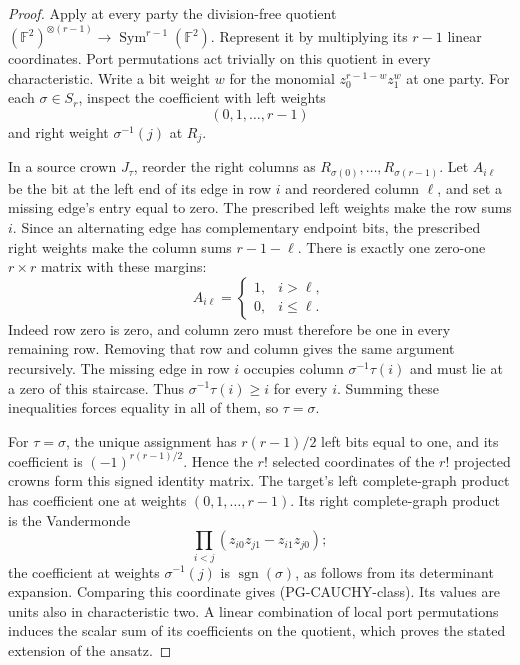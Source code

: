 \begin{proof}
Apply at every party the division-free quotient
$(\mathbb F^2)^{\otimes(r-1)}\to\operatorname{Sym}^{r-1}(\mathbb F^2)$.
Represent it by multiplying its $r-1$ linear coordinates. Port permutations
act trivially on this quotient in every characteristic. Write a bit weight
$w$ for the monomial $z_0^{r-1-w}z_1^w$ at one party.
For each $\sigma\in S_r$, inspect the coefficient with left weights
\[
 (0,1,\ldots,r-1)
\]
and right weight $\sigma^{-1}(j)$ at $R_j$.

In a source crown $J_\tau$, reorder the right columns as
$R_{\sigma(0)},\ldots,R_{\sigma(r-1)}$. Let $A_{i\ell}$ be the bit at the
left end of its edge in row $i$ and reordered column $\ell$, and set a
missing edge's entry equal to zero. The prescribed left weights make the
row sums $i$. Since an alternating edge has complementary endpoint bits,
the prescribed right weights make the column sums $r-1-\ell$.
There is exactly one zero-one $r\times r$ matrix with these margins:
\[
 A_{i\ell}=\begin{cases}1,&i>\ell,\\0,&i\leq\ell.\end{cases}
\]
Indeed row zero is zero, and column zero must therefore be one in every
remaining row. Removing that row and column gives the same argument
recursively. The missing edge in row $i$ occupies column
$\sigma^{-1}\tau(i)$ and must lie at a zero of this staircase. Thus
$\sigma^{-1}\tau(i)\geq i$ for every $i$. Summing these inequalities forces
equality in all of them, so $\tau=\sigma$.

For $\tau=\sigma$, the unique assignment has $r(r-1)/2$ left bits equal
to one, and its coefficient is $(-1)^{r(r-1)/2}$. Hence the $r!$ selected
coordinates of the $r!$ projected crowns form this signed identity matrix.
The target's left complete-graph product has coefficient one at weights
$(0,1,\ldots,r-1)$. Its right complete-graph product is the Vandermonde
\[
 \prod_{i<j}(z_{i0}z_{j1}-z_{i1}z_{j0});
\]
the coefficient at weights $\sigma^{-1}(j)$ is
$\operatorname{sgn}(\sigma)$, as follows from its determinant expansion.
Comparing this coordinate gives (PG-CAUCHY-class). Its values are units
also in characteristic two. A linear combination of local port
permutations induces the scalar sum of its coefficients on the quotient,
which proves the stated extension of the ansatz.
\end{proof}


